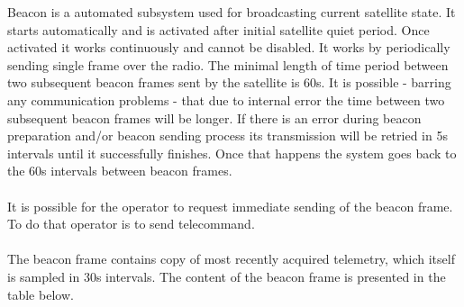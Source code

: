 
Beacon is a automated subsystem used for broadcasting current satellite state. It starts automatically and is activated after 
initial satellite quiet period. Once activated it works continuously and cannot be disabled. It works by periodically sending
single frame over the radio. The minimal length of time period between two subsequent beacon frames sent by the satellite is 
60s. It is possible - barring any communication problems - that due to internal error the time between two subsequent beacon 
frames will be longer. If there is an error during beacon preparation and/or beacon sending process its transmission will
be retried in 5s intervals until it successfully finishes. Once that happens the system goes back to the 60s intervals between
beacon frames. \\\\
It is possible for the operator to request immediate sending of the beacon frame. To do that operator is to send  
telecommand. \\\\
The beacon frame contains copy of most recently acquired telemetry, which itself is sampled in 30s intervals. The content 
of the beacon frame is presented in the table below. 

